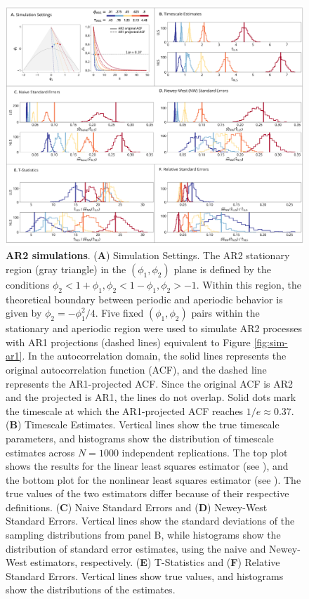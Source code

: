 \documentclass[latex/main.tex]{subfiles}
\begin{document}
\begin{figure}[H]
    \centering
    \includegraphics[width=1\textwidth]{latex/results/fig02-ar2.png} 
    \caption{
    \textbf{AR2 simulations}.
    (\textbf{A}) Simulation Settings. The AR2 stationary region (gray triangle) in the $(\phi_1, \phi_2)$ plane is defined by the conditions $\phi_2<1+\phi_1, \phi_2<1-\phi_1, \phi_2>-1$. Within this region, the theoretical boundary between periodic and aperiodic behavior is given by $\phi_2 = -\phi_1^2/4$. Five fixed $(\phi_1, \phi_2)$ pairs within the stationary and aperiodic region were used to simulate AR2 processes with AR1 projections (dashed lines) equivalent to Figure \ref{fig:sim-ar1}. In the autocorrelation domain, the solid lines represents the original autocorrelation function (ACF), and the dashed line represents the AR1-projected ACF. Since the original ACF is AR2 and the projected is AR1, the lines do not overlap. Solid dots mark the timescale at which the AR1-projected ACF reaches $1/e \approx 0.37$.
    (\textbf{B}) Timescale Estimates. Vertical lines show the true timescale parameters, and histograms show the distribution of timescale estimates across $N=1000$ independent replications. The top plot shows the results for the linear least squares estimator (see ), and the bottom plot for the nonlinear least squares estimator (see ). The true values of the two estimators differ because of their respective definitions.
    (\textbf{C}) Naive Standard Errors and (\textbf{D}) Newey-West Standard Errors. Vertical lines show the standard deviations of the sampling distributions from panel B, while histograms show the distribution of standard error estimates, using the naive and Newey-West estimators, respectively.
    (\textbf{E}) T-Statistics and (\textbf{F}) Relative Standard Errors. Vertical lines show true values, and histograms show the distributions of the estimates.
    }
    \label{fig:sim-ar2}
\end{figure}
\end{document}
